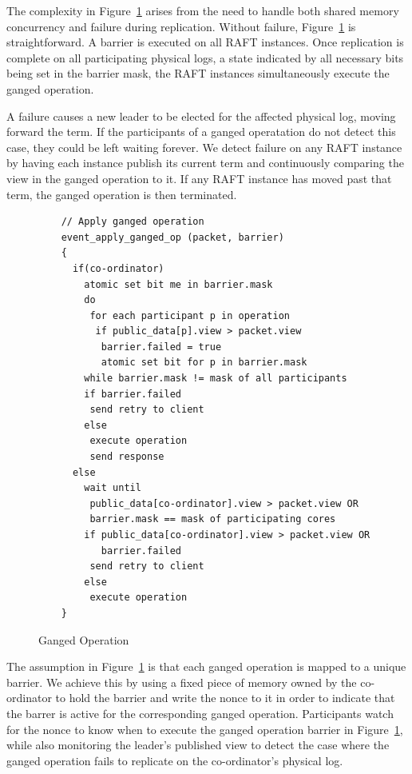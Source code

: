 \documentclass[pageno]{jpaper}
\begin{document}
The complexity in Figure~\ref{fig:ganged_ops} arises from the need to handle
both shared memory concurrency and failure during replication. Without failure,
Figure~\ref{fig:ganged_ops} is straightforward. A barrier is executed on all
RAFT instances. Once replication is complete on all participating physical logs,
a state indicated by all necessary bits being set in the barrier mask, the RAFT
instances simultaneously execute the ganged operation.

A failure causes a new leader to be elected for the affected physical log,
moving forward the term. If the participants of a ganged operatation do not
detect this case, they could be left waiting forever. We detect failure on any
RAFT instance by having each instance publish its current term and continuously
comparing the view in the ganged operation to it. If any RAFT instance has moved
past that term, the ganged operation is then terminated.

\begin{figure}
  \centering
  \scriptsize
  \bf
\begin{verbatim}
    // Apply ganged operation
    event_apply_ganged_op (packet, barrier)
    {
      if(co-ordinator)
        atomic set bit me in barrier.mask         
        do
         for each participant p in operation
          if public_data[p].view > packet.view
           barrier.failed = true 
           atomic set bit for p in barrier.mask
        while barrier.mask != mask of all participants
        if barrier.failed
         send retry to client
        else       
         execute operation
         send response
      else
        wait until 
         public_data[co-ordinator].view > packet.view OR
         barrier.mask == mask of participating cores
        if public_data[co-ordinator].view > packet.view OR
           barrier.failed
         send retry to client
        else
         execute operation
    }
\end{verbatim}
\caption{Ganged Operation}
\label{fig:ganged_ops}
\end{figure}

The assumption in Figure~\ref{fig:ganged_ops} is that each ganged operation is
mapped to a unique barrier. We achieve this by using a fixed piece of memory
owned by the co-ordinator to hold the barrier and write the nonce to it in order
to indicate that the barrer is active for the corresponding ganged
operation. Participants watch for the nonce to know when to execute the
ganged operation barrier in Figure~\ref{fig:ganged_ops}, while also monitoring
the leader's published view to detect the case where the ganged operation fails
to replicate on the co-ordinator's physical log.
\end{document}

